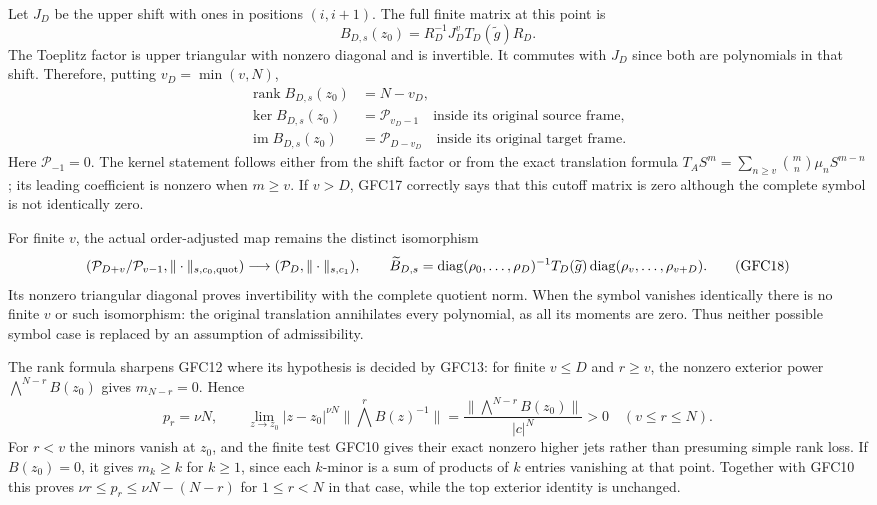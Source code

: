 \documentclass[11pt]{article}
\begin{document}
Let $J_D$ be the upper shift with ones in positions $(i,i+1)$.
The full finite matrix at this point is
\[
 B_{D,s}(z_0)=R_D^{-1}J_D^vT_D(\widetilde g)R_D.
 \tag{GFC16}
\]
The Toeplitz factor is upper triangular with nonzero diagonal and
is invertible. It commutes with $J_D$ since both are polynomials
in that shift. Therefore, putting $v_D=\min(v,N)$,
\[
 \begin{split}
 \operatorname{rank}B_{D,s}(z_0)&=N-v_D,\\
 \ker B_{D,s}(z_0)&=\mathcal P_{v_D-1}
               \quad\text{inside its original source frame},\\
 \operatorname{im}B_{D,s}(z_0)&=\mathcal P_{D-v_D}
               \quad\text{inside its original target frame}.
 \end{split}\tag{GFC17}
\]
Here $\mathcal P_{-1}=0$. The kernel statement follows either
from the shift factor or from the exact translation formula
$T_AS^m=\sum_{n\ge v}\binom mn\mu_nS^{m-n}$; its leading
coefficient is nonzero when $m\ge v$.
If $v>D$, GFC17 correctly says that this cutoff matrix is zero
although the complete symbol is not identically zero.

For finite $v$, the actual order-adjusted map remains the distinct
isomorphism
\[
 (\mathcal P_{D+v}/\mathcal P_{v-1},\|\cdot\|_{s,c_0,\rm quot})
       \longrightarrow(\mathcal P_D,\|\cdot\|_{s,c_1}),\qquad
 \widetilde B_{D,s}=
 \operatorname{diag}(\rho_0,\ldots,\rho_D)^{-1}
 T_D(\widetilde g)
 \operatorname{diag}(\rho_v,\ldots,\rho_{v+D}).
 \tag{GFC18}
\]
Its nonzero triangular diagonal proves invertibility with the complete
quotient norm. When the symbol vanishes identically there is no
finite $v$ or such isomorphism: the original translation annihilates
every polynomial, as all its moments are zero. Thus neither possible
symbol case is replaced by an assumption of admissibility.

The rank formula sharpens GFC12 where its hypothesis is decided by
GFC13: for finite $v\le D$ and $r\ge v$, the nonzero exterior
power $\bigwedge^{N-r}B(z_0)$ gives $m_{N-r}=0$. Hence
\[
 p_r=\nu N,\qquad
 \lim_{z\to z_0}|z-z_0|^{\nu N}\|\bigwedge^rB(z)^{-1}\|
   =\frac{\|\bigwedge^{N-r}B(z_0)\|}{|c|^N}>0
              \quad(v\le r\le N).
 \tag{GFC19}
\]
For $r<v$ the minors vanish at $z_0$, and the finite test GFC10
gives their exact nonzero higher jets rather than presuming simple
rank loss. If $B(z_0)=0$, it gives $m_k\ge k$ for $k\ge1$,
since each $k$-minor is a sum of products of $k$ entries vanishing
at that point. Together with GFC10 this proves
$\nu r\le p_r\le\nu N-(N-r)$ for $1\le r<N$ in that case,
while the top exterior identity is unchanged.
\end{document}
